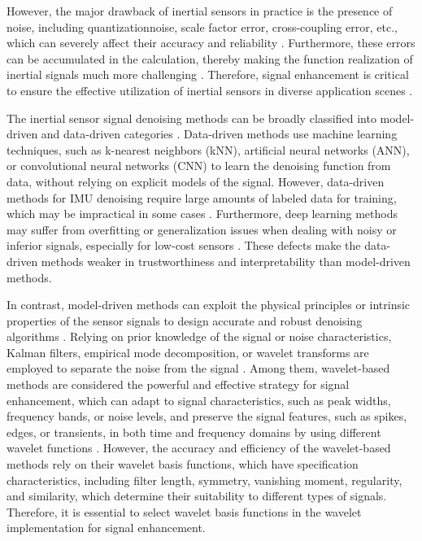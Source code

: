 \documentclass[letterpaper]{article}
\begin{document}
	However, the major drawback of inertial sensors in practice is the presence of noise, including quantizationnoise, scale factor error, cross-coupling error, etc., which can severely affect their accuracy and reliability \cite{chen2020deep}.
	Furthermore, these errors can be accumulated in the calculation, thereby making the function realization of inertial signals much more challenging \cite{10080916, saha2022tinyodom, saha2023inertial}.
	Therefore, signal enhancement is critical to ensure the effective utilization of inertial sensors in diverse application scenes \cite{caesar2020nuscenes}.

	The inertial sensor signal denoising methods can be broadly classified into model-driven and data-driven categories \cite{golestani2020human}. Data-driven methods use machine learning techniques, such as k-nearest neighbors (kNN), artificial neural networks (ANN), or convolutional neural networks (CNN) \cite{engelsman2023data} to learn the denoising function from data, without relying on explicit models of the signal.
	However, data-driven methods for IMU denoising require large amounts of labeled data for training, which may be impractical in some cases \cite{herath2020ronin}. Furthermore, deep learning methods may suffer from overfitting or generalization issues when dealing with noisy or inferior signals, especially for low-cost sensors \cite{yuan2023simple}. These defects make the data-driven methods weaker in trustworthiness and interpretability than model-driven methods.

	In contrast, model-driven methods can exploit the physical principles or intrinsic properties of the sensor signals \cite{9119813} to design accurate and robust denoising algorithms \cite{min2021drop}. Relying on prior knowledge of the signal or noise characteristics, Kalman filters, empirical mode decomposition, or wavelet transforms are employed to separate the noise from the signal \cite{liu2020denoising,he2019noise}. Among them, wavelet-based methods are considered the powerful and effective strategy for signal enhancement, which can adapt to signal characteristics, such as peak widths, frequency bands, or noise levels, and preserve the signal features, such as spikes, edges, or transients, in both time and frequency domains by using different wavelet functions \cite{saydjari2022equivariant}. However, the accuracy and efficiency of the wavelet-based methods rely on their wavelet basis functions, which have specification characteristics, including filter length, symmetry, vanishing moment, regularity, and similarity, which determine their suitability to different types of signals. Therefore, it is essential to select wavelet basis functions in the wavelet implementation for signal enhancement.
\end{document}
